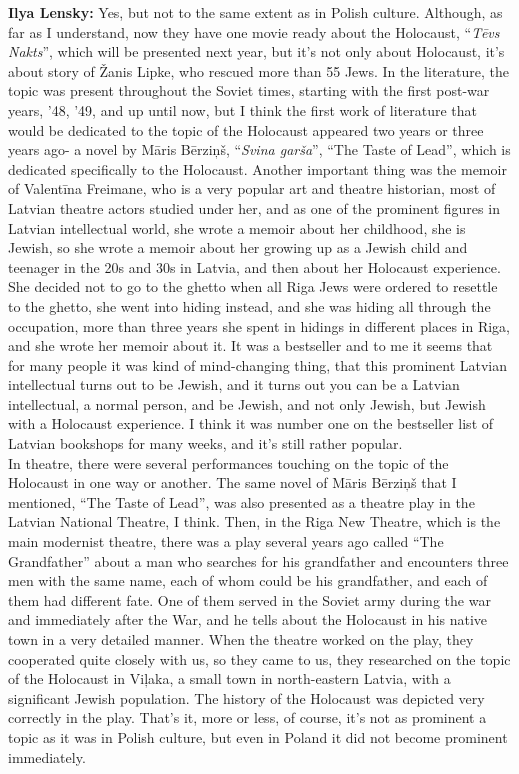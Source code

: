 \textbf{Ilya Lensky:} Yes, but not to the same extent as in Polish culture. Although, as far as I understand, now they have one movie ready about the Holocaust, ``\textit{Tēvs Nakts}'', which will be presented next year, but it’s not only about Holocaust, it’s about story of Žanis Lipke, who rescued more than 55 Jews. In the literature, the topic was present throughout the Soviet times, starting with the first post-war years, '48, '49, and up until now, but I think the first work of literature that would be dedicated to the topic of the Holocaust appeared two years or three years ago- a novel by Māris Bērziņš, “\textit{Svina garša}”, ``The Taste of Lead'', which is dedicated specifically to the Holocaust. Another important thing was the memoir of Valentīna Freimane, who is a very popular art and theatre historian, most of Latvian theatre actors studied under her, and as one of the prominent figures in Latvian intellectual world, she wrote a memoir about her childhood, she is Jewish, so she wrote a memoir about her growing up as a Jewish child and teenager in the 20s and 30s in Latvia, and then about her Holocaust experience. She decided not to go to the ghetto when all Riga Jews were ordered to resettle to the ghetto, she went into hiding instead, and she was hiding all through the occupation, more than three years she spent in hidings in different places in Riga, and she wrote her memoir about it. It was a bestseller and to me it seems that for many people it was kind of mind-changing thing, that this prominent Latvian intellectual turns out to be Jewish, and it turns out you can be a Latvian intellectual, a normal person, and be Jewish, and not only Jewish, but Jewish with a Holocaust experience. I think it was number one on the bestseller list of Latvian bookshops for many weeks, and it’s still rather popular. \\
In theatre, there were several performances touching on the topic of the Holocaust in one way or another. The same novel of Māris Bērziņš that I mentioned, “The Taste of Lead”, was also presented as a theatre play in the Latvian National Theatre, I think. Then, in the Riga New Theatre, which is the main modernist theatre, there was a play several years ago called “The Grandfather” about a man who searches for his grandfather and encounters three men with the same name, each of whom could be his grandfather, and each of them had different fate. One of them served in the Soviet army during the war and immediately after the War, and he tells about the Holocaust in his native town in a very detailed manner. When the theatre worked on the play, they cooperated quite closely with us, so they came to us, they researched on the topic of the Holocaust in Viļaka, a small town in north-eastern Latvia, with a significant Jewish population. The history of the Holocaust was depicted very correctly in the play. That’s it, more or less, of course, it’s not as prominent a topic as it was in Polish culture, but even in Poland it did not become prominent immediately.

